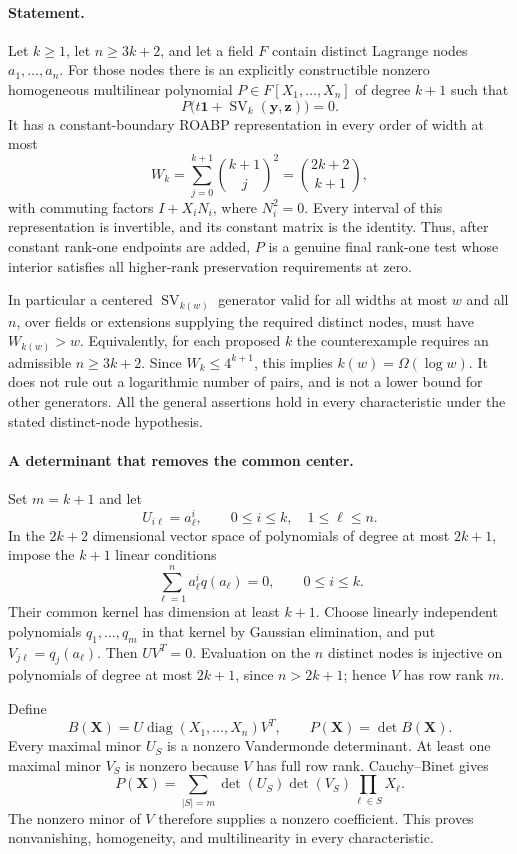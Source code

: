 \paragraph{Statement.}
Let $k\ge1$, let $n\ge3k+2$, and let a field $F$ contain
distinct Lagrange nodes $a_1,\ldots,a_n$.  For those nodes there
is an explicitly constructible nonzero homogeneous multilinear
polynomial $P\in F[X_1,\ldots,X_n]$ of degree $k+1$ such that
\[
 P\bigl(t\mathbf1+\operatorname{SV}_k(\mathbf y,\mathbf z)\bigr)=0.
 \tag{I.32}\label{eq:I-centered-sv-zero}
\]
It has a constant-boundary ROABP representation in every order
of width at most
\[
 W_k=\sum_{j=0}^{k+1}\binom{k+1}{j}^{\!2}
       =\binom{2k+2}{k+1},
 \tag{I.33}\label{eq:I-centered-sv-width}
\]
with commuting factors $I+X_iN_i$, where $N_i^2=0$.
Every interval of this representation is invertible, and its
constant matrix is the identity.  Thus, after constant
rank-one endpoints are added, $P$ is a genuine final rank-one
test whose interior satisfies all higher-rank preservation
requirements at zero.

In particular a centered $\operatorname{SV}_{k(w)}$ generator
valid for all widths at most $w$ and all $n$, over fields or
extensions supplying the required distinct nodes, must have
$W_{k(w)}>w$.  Equivalently, for each proposed $k$ the
counterexample requires an admissible $n\ge3k+2$.
Since $W_k\le4^{k+1}$, this implies
$k(w)=\Omega(\log w)$.  It does not rule out a logarithmic
number of pairs, and is not a lower bound for other generators.
All the general assertions hold in every characteristic under
the stated distinct-node hypothesis.

\paragraph{A determinant that removes the common center.}
Set $m=k+1$ and let
\[
 U_{i\ell}=a_\ell^i,\qquad 0\le i\le k,\quad1\le\ell\le n.
\]
In the $2k+2$ dimensional vector space of polynomials of degree
at most $2k+1$, impose the $k+1$ linear conditions
\[
 \sum_{\ell=1}^n a_\ell^i q(a_\ell)=0,
       \qquad0\le i\le k.
\]
Their common kernel has dimension at least $k+1$.
Choose linearly independent polynomials
$q_1,\ldots,q_m$ in that kernel by Gaussian elimination, and
put $V_{j\ell}=q_j(a_\ell)$.  Then $UV^T=0$.
Evaluation on the $n$ distinct nodes is injective on polynomials
of degree at most $2k+1$, since $n>2k+1$; hence $V$ has row
rank $m$.

Define
\[
 B(\mathbf X)=U\operatorname{diag}(X_1,\ldots,X_n)V^T,
 \qquad P(\mathbf X)=\det B(\mathbf X).
 \tag{I.34}
\]
Every maximal minor $U_S$ is a nonzero Vandermonde determinant.
At least one maximal minor $V_S$ is nonzero because $V$ has
full row rank.  Cauchy--Binet gives
\[
 P(\mathbf X)=\sum_{|S|=m}\det(U_S)\det(V_S)
                                  \prod_{\ell\in S}X_\ell.
\]
The nonzero minor of $V$ therefore supplies a nonzero coefficient.
This proves nonvanishing, homogeneity, and multilinearity in
every characteristic.

